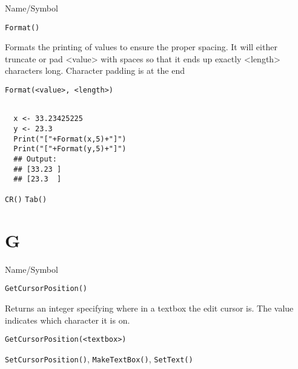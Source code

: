 \begin{desc}{Name/Symbol}
\item[Name/Symbol]	\verb+Format()+            

\item[Description]	Formats the printing of values to ensure the
  proper spacing. It will either truncate or pad <value> with spaces
  so that it ends up exactly <length> characters long.  Character
  padding is at the end
 

\item[Usage]
\begin{verbatim}
Format(<value>, <length>)
\end{verbatim}

\item[Example]	
\begin{verbatim}

  x <- 33.23425225
  y <- 23.3
  Print("["+Format(x,5)+"]")
  Print("["+Format(y,5)+"]")
  ## Output: 
  ## [33.23 ]
  ## [23.3  ]
\end{verbatim}
         

\item[See Also]	
\verb+CR()+ \verb+Tab()+
\end{desc}

\rl
\section{G}
\rl


\begin{desc}{Name/Symbol}
\item[Name/Symbol]	\verb+GetCursorPosition()+

\item[Description]	Returns an integer specifying where in a textbox the edit cursor is.  The value indicates which character it is on.

\item[Usage]
\begin{verbatim}
GetCursorPosition(<textbox>)
\end{verbatim}

\item[Example]	

\item[See Also]	\verb+SetCursorPosition()+, \verb+MakeTextBox()+, \verb+SetText()+
\end{desc}

\rl


